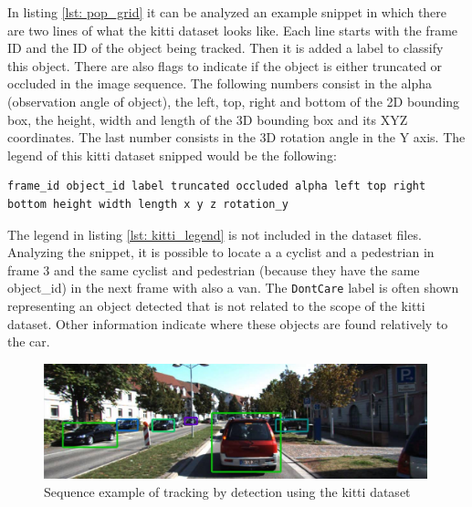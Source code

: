 In listing \ref{lst: pop_grid} it can be analyzed an example snippet in which there are two lines of what the \gls{kitti} dataset looks like. Each line starts with the frame ID and the ID of the object being tracked. Then it is added a label to classify this object. There are also flags to indicate if the object is either truncated or occluded in the image sequence. The following numbers consist in the alpha (observation angle of object), the left, top, right and bottom of the 2D bounding box, the height, width and length of the 3D bounding box and its XYZ coordinates. The last number consists in the 3D rotation angle in the Y axis. \cite{Team} The legend of this \gls{kitti} dataset snipped would be the following:

\begin{center}
	\begin{lstlisting}[caption={KITTI dataset file snippet legend.}, label={lst: kitti_legend}]
	frame_id object_id label truncated occluded alpha left top right bottom height width length x y z rotation_y	\end{lstlisting}
\end{center}

The legend in listing \ref{lst: kitti_legend} is not included in the dataset files. Analyzing the snippet, it is possible to locate a a cyclist and a pedestrian in frame 3 and the same cyclist and pedestrian (because they have the same object\_id) in the next frame with also a van. The \texttt{DontCare} label is often shown representing an object detected that is not related to the scope of the \gls{kitti} dataset. Other information indicate where these objects are found relatively to the car.

\begin{figure}[htp]
	
	\centering
	\includegraphics[width=0.99\textwidth]{capstate/imgs/kittiresult}
	
	\caption{Sequence example of tracking by detection using the \gls{kitti} dataset}
	\label{fig:kittiresult}
	
\end{figure}
	
